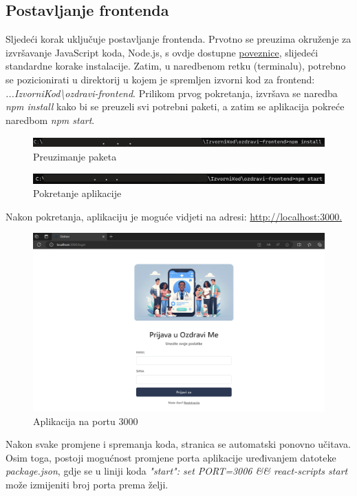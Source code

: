 	\subsection*{Postavljanje frontenda}
	Sljedeći korak uključuje postavljanje frontenda. Prvotno se preuzima okruženje za izvršavanje JavaScript koda, Node.js, s ovdje dostupne 
	\href{https://nodejs.org/en/download/}{poveznice}, slijedeći standardne korake instalacije. Zatim, u naredbenom retku (terminalu), potrebno se pozicionirati 
	u direktorij u kojem je spremljen izvorni kod za frontend: \textit{...IzvorniKod\textbackslash ozdravi-frontend}. Prilikom prvog pokretanja, izvršava se naredba \textit{npm install} kako bi se 
	preuzeli svi potrebni paketi, a zatim se aplikacija pokreće naredbom \textit{npm start}.
	\begin{figure}[H]
		\includegraphics[width=\textwidth]{slike/npmin.png} 
		\caption{Preuzimanje paketa} 
	\end{figure}
	\begin{figure}[H]
		\includegraphics[width=\textwidth]{slike/npmst.png} 
		\caption{Pokretanje aplikacije} 
	\end{figure}
	
	\newpage \noindent Nakon pokretanja, aplikaciju je moguće vidjeti na adresi: \url{http://localhost:3000.}\\
	\begin{figure}[H]
		\includegraphics[width=\textwidth]{slike/loc3000.png} 
		\caption{Aplikacija na portu 3000} 
	   \end{figure}
	Nakon svake promjene i spremanja koda, stranica se automatski ponovno učitava. Osim toga, postoji mogućnost promjene porta aplikacije uređivanjem datoteke 
	\textit{package.json}, 
	gdje se u liniji koda 
	\textit{"start": set PORT=3006 \&\& react-scripts start} može izmijeniti broj porta prema želji.
	\eject 